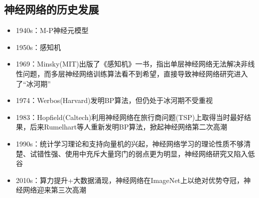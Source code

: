 \subsection{神经网络的历史发展}
\begin{itemize}
	\item 1940s：M-P神经元模型
	\item 1950s：感知机
	\item 1969：Minsky(MIT)出版了《感知机》一书，指出单层神经网络无法解决非线性问题，而多层神经网络训练算法看不到希望，直接导致神经网络研究进入了``冰河期''
	\item 1974：Werbos(Harvard)发明BP算法，但仍处于冰河期不受重视
	\item 1983：Hopfield(Caltech)利用神经网络在旅行商问题(TSP)上取得当时最好结果，后来Rumelhart等人重新发明BP算法，掀起神经网络第二次高潮
	\item 1990s：统计学习理论和支持向量机的兴起，神经网络学习的理论性质不够清楚、试错性强、使用中充斥大量窍门的弱点更为明显，神经网络研究又陷入低谷
	\item 2010s：算力提升+大数据涌现，神经网络在ImageNet上以绝对优势夺冠，神经网络迎来第三次高潮
\end{itemize}